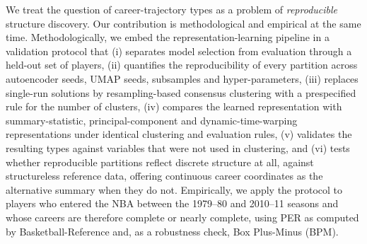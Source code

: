 We treat the question of career-trajectory types as a problem of \emph{reproducible} structure discovery. Our contribution is methodological and empirical at the same time. Methodologically, we embed the representation-learning pipeline in a validation protocol that (i) separates model selection from evaluation through a held-out set of players, (ii) quantifies the reproducibility of every partition across autoencoder seeds, UMAP seeds, subsamples and hyper-parameters, (iii) replaces single-run solutions by resampling-based consensus clustering \citep{monti2003,fred2005} with a prespecified rule for the number of clusters, (iv) compares the learned representation with summary-statistic, principal-component and dynamic-time-warping representations under identical clustering and evaluation rules, (v) validates the resulting types against variables that were not used in clustering, and (vi) tests whether reproducible partitions reflect discrete structure at all, against structureless reference data, offering continuous career coordinates as the alternative summary when they do not. Empirically, we apply the protocol to \nPlayers{} players who entered the NBA between the 1979--80 and 2010--11 seasons and whose careers are therefore complete or nearly complete, using PER as computed by Basketball-Reference and, as a robustness check, Box Plus-Minus (BPM).

